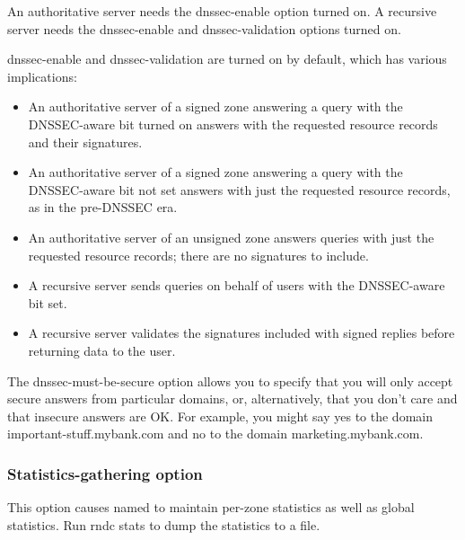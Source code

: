 An authoritative server needs the {dnssec-enable} option turned on. A
recursive server needs the {dnssec-enable} and
\protect\hypertarget{part0024_split_037.htmlux5cux23_idIndexMarker2161}{}{}{dnssec-validation}
options turned on.

{dnssec-enable} and {dnssec-validation} are turned on by default, which
has various implications:

\begin{itemize}
\item
  An authoritative server of a signed zone answering a query with the
  {DNSSEC}-aware bit turned on answers with the requested resource
  records and their signatures.
\item
  An authoritative server of a signed zone answering a query with the
  {DNSSEC}-aware bit {not} set answers with just the requested resource
  records, as in the pre-DNSSEC era.
\item
  An authoritative server of an unsigned zone answers queries with just
  the requested resource records; there are no signatures to include.
\item
  A recursive server sends queries on behalf of users with the
  DNSSEC-aware bit set.
\item
  A recursive server validates the signatures included with signed
  replies before returning data to the user.
\end{itemize}

The {dnssec-must-be-secure} option allows you to specify that you will
only accept secure answers from particular domains, or, alternatively,
that you don't care and that insecure answers are OK. For example, you
might say yes to the domain {important-stuff.mybank.com} and no to the
domain {marketing.mybank.com}.

\subsubsection[Statistics-gathering
option]{\texorpdfstring{Statistics-gathering
option\protect\hypertarget{part0024_split_037.htmlux5cux23_idIndexMarker2162}{}{}}{Statistics-gathering option}}


\protect\hypertarget{part0024_split_037.htmlux5cux23_idIndexMarker2163}{}{}This
option causes {named} to maintain per-zone statistics as well as global
statistics.
\protect\hypertarget{part0024_split_037.htmlux5cux23_idIndexMarker2164}{}{}Run
\protect\hypertarget{part0024_split_037.htmlux5cux23_idIndexMarker2165}{}{}{rndc
stats} to dump the statistics to a file.

